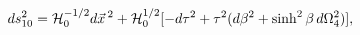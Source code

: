 \begin{equation}
ds_{10}^2={\cal H}_0^{-1/2}d\vec x\,^2+{\cal H}_0^{1/2}[-d\tau^2
+\tau^2(d\beta^2+\sinh^2\beta\,d\Omega_4^2)],
\end{equation}

